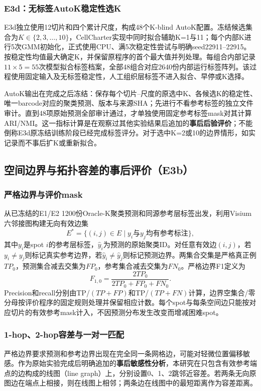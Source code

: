 \subsubsection{E3d：无标签AutoK稳定性选K}
E3d独立使用12切片和四个累计尺度，构成48个K-blind AutoK配置。冻结候选集合为$K\in\{2,3,\ldots,10\}$，CellCharter实现中同时拟合辅助K=1与11；每个内部K进行5次GMM初始化，正式使用CPU、满5次稳定性尝试与明确seed22911--22915。按稳定性均值最大确定K，并保留原程序的首个最大值并列处理。每组合内部记录$11\times5=55$次模型拟合标签档案，全部48组合对应2640份内部运行标签阵列。该过程使用固定输入及无标签稳定性，人工组织层标签不进入拟合、早停或K选择。

AutoK输出在完成之后冻结：保存每个切片--尺度的原选中K、各候选K的稳定性、唯一barcode对应的聚类预测、版本与来源SHA；先进行不看参考标签的独立文件审计。直到48项原始预测全部审计通过，才单独使用固定参考标签mask对其计算ARI/NMI。这一指标计算是在观察过其他实验结果后追加的\textbf{事后后验评价}；不能倒称E3d原冻结训练阶段已经完成标签评分。对于选中K=2或10的边界情形，如实记录而不事后扩K或重新拟合。

\subsection{空间边界与拓扑容差的事后评价（E3b）}
\label{subsec:cc-boundary-v1}

\subsubsection{严格边界与评价mask}
从已冻结的E1/E2 1200份Oracle-K聚类预测和同源参考层标签出发，利用Visium六邻接图构建无向有效边集
\begin{equation}
E^\ast=\{(i,j)\in E\mid y_i\text{与}y_j\text{均有参考标注}\},
\end{equation}
其中$y_i$是spot $i$的参考层标签，$\hat{y}_i$为预测的原始聚类ID。对任意有效边$(i,j)$，若$y_i\ne y_j$则标记真实参考边界，若$\hat{y}_i\ne\hat{y}_j$则标记预测边界。两集合交集是严格真正例$TP_0$，预测集合减去交集为$FP_0$，参考集合减去交集为$FN_0$。严格边界F1定义为
\begin{equation}
F_{1,0}=\frac{2TP_0}{2TP_0+FP_0+FN_0}.
\label{eq:cc-boundary-f1-v1}
\end{equation}
Precision和recall分别由TP/$(TP+FP)$和TP/$(TP+FN)$计算，边界空集合/零分母按评价程序的固定规则处理并保留相应计数。每个spot与每条空间边只能按对应切片的有效参考mask计入，不因预测分布发生改变而增减困难spot。

\subsubsection{1-hop、2-hop容差与一对一匹配}
严格边界要求预测和参考边界出现在完全同一条网格边，可能对轻微位置偏移敏感。作为原始实验完成后明确追加的\textbf{事后敏感性分析}，本研究在只包含有效参考端点的边构成的线图（line graph）上，分别设置0、1、2跳邻近容差。若两条无向原图边在端点上相接，则在线图上相邻；两条边在线图中的最短距离作为容差距离。

